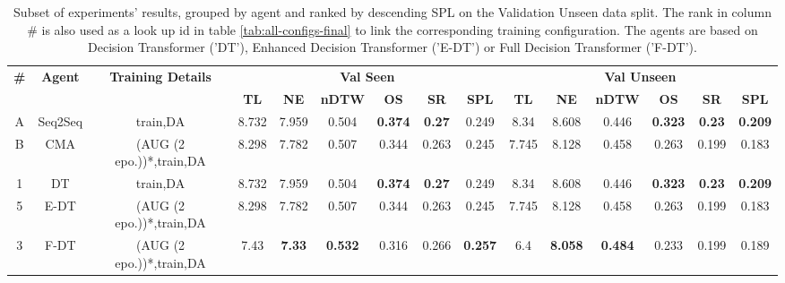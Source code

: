 \begin{table}
\centering
\caption{\label{tab:best_unseen_50}Subset of experiments' results, grouped by agent and ranked by descending SPL on the Validation Unseen data split. The rank in column \# is also used as a look up id in table \ref{tab:all-configs-final} to link the corresponding training configuration.     \newline The agents are based on Decision Transformer ('DT'), Enhanced Decision Transformer ('E-DT') or Full Decision Transformer ('F-DT').}
\begin{tabular}{@{\hskip3pt}c@{\hskip3pt}c@{\hskip3pt}c@{\hskip3pt}c@{\hskip3pt}c@{\hskip3pt}c@{\hskip3pt}c@{\hskip3pt}c@{\hskip3pt}c@{\hskip3pt}c@{\hskip3pt}c@{\hskip3pt}c@{\hskip3pt}c@{\hskip3pt}c@{\hskip3pt}c}
\toprule
\textbf{\#} & \textbf{Agent} & \textbf{Training Details} & \multicolumn{6}{c}{\textbf{Val Seen}} & \multicolumn{6}{c}{\textbf{Val Unseen}} \\
 \textbf{~} &     \textbf{~} &                \textbf{~} &       \textbf{TL} &    \textbf{NE} &   \textbf{nDTW} &     \textbf{OS} &    \textbf{SR} &    \textbf{SPL} &         \textbf{TL} &     \textbf{NE} &   \textbf{nDTW} &     \textbf{OS} &    \textbf{SR} &    \textbf{SPL} \\
          A &             Seq2Seq &                  train,DA &             8.732 &          7.959 &           0.504 &  \textbf{0.374} &  \textbf{0.27} &           0.249 &                8.34 &           8.608 &           0.446 &  \textbf{0.323} &  \textbf{0.23} &  \textbf{0.209} \\
          B &           CMA &  (AUG (2 epo.))*,train,DA &             8.298 &          7.782 &           0.507 &           0.344 &          0.263 &           0.245 &               7.745 &           8.128 &           0.458 &           0.263 &          0.199 &           0.183 \\
\midrule
          1 &             DT &                  train,DA &             8.732 &          7.959 &           0.504 &  \textbf{0.374} &  \textbf{0.27} &           0.249 &                8.34 &           8.608 &           0.446 &  \textbf{0.323} &  \textbf{0.23} &  \textbf{0.209} \\
          5 &           E-DT &  (AUG (2 epo.))*,train,DA &             8.298 &          7.782 &           0.507 &           0.344 &          0.263 &           0.245 &               7.745 &           8.128 &           0.458 &           0.263 &          0.199 &           0.183 \\
          3 &           F-DT &  (AUG (2 epo.))*,train,DA &              7.43 &  \textbf{7.33} &  \textbf{0.532} &           0.316 &          0.266 &  \textbf{0.257} &                 6.4 &  \textbf{8.058} &  \textbf{0.484} &           0.233 &          0.199 &           0.189 \\
\bottomrule
\end{tabular}
\end{table}
